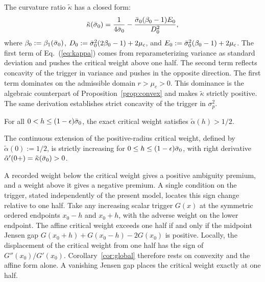 The curvature ratio $\tilde{\kappa}$ has a closed form:
\begin{equation}
\tilde{\kappa}(\bar{\sigma}_0)=\frac{1}{4\bar{\sigma}_0}-\frac{\bar{\sigma}_0(\beta_0-1)E_0}{D_0^{2}},
\label{eq:kappa}
\end{equation}
where $\beta_0:=\beta_1(\bar{\sigma}_0)$, $D_0:=\bar{\sigma}_0^{2}(2\beta_0-1)+2\mu_c$, and $E_0:=\bar{\sigma}_0^{2}(\beta_0-1)+2\mu_c$. The first term of Eq.~(\ref{eq:kappa}) comes from reparameterizing variance as standard deviation and pushes the critical weight above one half. The second term reflects concavity of the trigger in variance and pushes in the opposite direction. The first term dominates on the admissible domain $r>\mu_c>0$. This dominance is the algebraic counterpart of Proposition~\ref{prop:convex} and makes $\tilde{\kappa}$ strictly positive. The same derivation establishes strict concavity of the trigger in $\sigma_p^{2}$.

\begin{corollary}\label{cor:global}
For all $0<h\le(1-\epsilon)\bar{\sigma}_0$, the exact critical weight satisfies $\tilde{\alpha}(h)>1/2$.
\end{corollary}

\begin{corollary}\label{cor:mono}
The continuous extension of the positive-radius critical weight, defined by $\tilde{\alpha}(0):=1/2$, is strictly increasing for $0\le h\le(1-\epsilon)\bar{\sigma}_0$, with right derivative $\tilde{\alpha}'(0+)=\tilde{\kappa}(\bar{\sigma}_0)>0$.
\end{corollary}

A recorded weight below the critical weight gives a positive ambiguity premium, and a weight above it gives a negative premium. A single condition on the trigger, stated independently of the present model, locates this sign change relative to one half. Take any increasing scalar trigger $G(x)$ at the symmetric ordered endpoints $x_0-h$ and $x_0+h$, with the adverse weight on the lower endpoint. The affine critical weight exceeds one half if and only if the midpoint Jensen gap $G(x_0+h)+G(x_0-h)-2G(x_0)$ is positive. Locally, the displacement of the critical weight from one half has the sign of $G''(x_0)/G'(x_0)$. Corollary~\ref{cor:global} therefore rests on convexity and the affine form alone. A vanishing Jensen gap places the critical weight exactly at one half.

